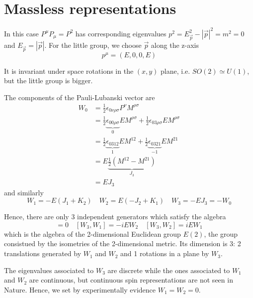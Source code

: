 \section{Massless representations}

    In this case $P^\mu P_\mu = P^2$ has corresponding eigenvalues $p^2 = E_{\vec p}^2 - |\vec p|^2 = m^2 = 0$ and $E_{\vec p} = |\vec p|$. For the little group, we choose $\vec p$ along the z-axis
    \begin{equation*}
        p^\mu = (E, 0, 0, E)
    \end{equation*}

    It is invariant under space rotations in the $(x, y)$ plane, i.e. $SO(2) \simeq U(1)$, but the little group is bigger. 

    The components of the Pauli-Lubanski vector are 
    \begin{equation*}
    \begin{aligned}
        W_0 & = \frac{1}{2} \epsilon_{0 \nu \rho \sigma} P^\nu M^{\rho \sigma} \\ & = \frac{1}{2} \underbrace{\epsilon_{0 0 \rho \sigma}}_{0} E M^{\rho \sigma} + \frac{1}{2} \epsilon_{0 3 \rho \sigma} E M^{\rho \sigma} \\ & = \frac{1}{2} \underbrace{\epsilon_{0 3 1 2 }}_{1} E M^{12} + \frac{1}{2} \underbrace{\epsilon_{0 3 21}}_{-1} E M^{21} \\ & = E \underbrace{\frac{1}{2} (M^{12} - M^{21})}_{J_3} \\ & = E J_3
    \end{aligned}
    \end{equation*}
    and similarly
    \begin{equation*}
        W_1 = - E (J_1 + K_2) \quad W_2 = E (- J_2 + K_1) \quad W_3 = - E J_3 = - W_0
    \end{equation*}

    Hence, there are only 3 independent generators which satisfy the algebra
    \begin{equation*}
        [W_1, W_2] = 0 \quad [W_3, W_1] = - i E W_2 \quad [W_3, W_2] = i E W_1
    \end{equation*}
    which is the algebra of the 2-dimensional Euclidean group $E(2)$, the group consistued by the isometries of the 2-dimensional metric. Its dimension is 3: 2 translations generated by $W_1$ and $W_2$ and 1 rotations in a plane by $W_3$. 

    The eigenvalues associated to $W_3$ are discrete while the ones associated to $W_1$ and $W_2$ are continuous, but continuous spin representations are not seen in Nature. Hence, we set by experimentally evidence $W_1 = W_2 = 0$. 

